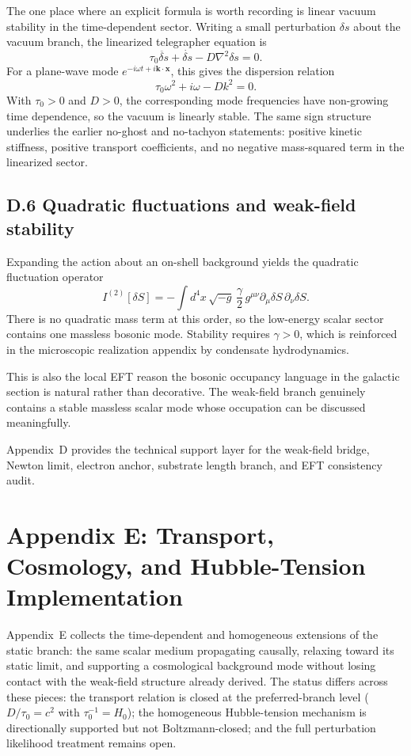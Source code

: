 \documentclass[11pt]{article}
\begin{document}
The one place where an explicit formula is worth recording is linear vacuum stability in the time-dependent sector. Writing a small perturbation $\delta s$ about the vacuum branch, the linearized telegrapher equation is
\[
\tau_0\ddot{\delta s}+\dot{\delta s}-D\nabla^2\delta s=0.
\]
For a plane-wave mode $e^{-i\omega t+i\mathbf{k}\cdot\mathbf{x}}$, this gives the dispersion relation
\[
\tau_0\omega^2+i\omega-Dk^2=0.
\]
With $\tau_0>0$ and $D>0$, the corresponding mode frequencies have non-growing time dependence, so the vacuum is linearly stable. The same sign structure underlies the earlier no-ghost and no-tachyon statements: positive kinetic stiffness, positive transport coefficients, and no negative mass-squared term in the linearized sector.

\subsection*{D.6 Quadratic fluctuations and weak-field stability}

Expanding the action about an on-shell background yields the quadratic fluctuation operator
\[
I^{(2)}[\delta S]
=
-\int d^4x\,\sqrt{-g}\,
\frac{\gamma}{2}\,
g^{\mu\nu}\partial_\mu\delta S\,\partial_\nu\delta S.
\]
There is no quadratic mass term at this order, so the low-energy scalar sector contains one massless bosonic mode. Stability requires $\gamma>0$, which is reinforced in the microscopic realization appendix by condensate hydrodynamics.

This is also the local EFT reason the bosonic occupancy language in the galactic section is natural rather than decorative. The weak-field branch genuinely contains a stable massless scalar mode whose occupation can be discussed meaningfully.

Appendix~D provides the technical support layer for the weak-field bridge, Newton limit, electron anchor, substrate length branch, and EFT consistency audit.

\section*{Appendix E: Transport, Cosmology, and Hubble-Tension Implementation}

Appendix~E collects the time-dependent and homogeneous extensions of the static branch: the same scalar medium propagating causally, relaxing toward its static limit, and supporting a cosmological background mode without losing contact with the weak-field structure already derived. The status differs across these pieces: the transport relation is closed at the preferred-branch level ($D/\tau_0=c^2$ with $\tau_0^{-1}=H_0$); the homogeneous Hubble-tension mechanism is directionally supported but not Boltzmann-closed; and the full perturbation likelihood treatment remains open.
\end{document}
